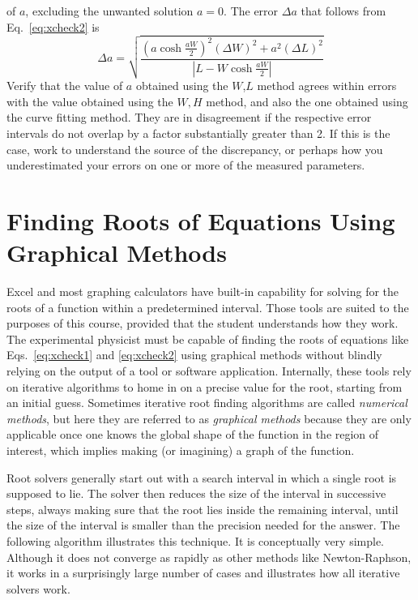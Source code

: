 \documentclass{revtex4}
\begin{document}
of $a$, excluding the unwanted solution $a=0$. The error $\Delta a$
that follows from Eq.~\ref{eq:xcheck2} is
\begin{equation}
\Delta a = \sqrt{\frac{\left(a\cosh{\frac{aW}{2}}\right)^2
(\Delta W)^2 +a^2(\Delta L)^2}{\left| L-W\cosh{\frac{aW}{2}}\right|}}
\label{eq:xcheck2err}
\end{equation}
Verify that the value of $a$ obtained using the $W$,$L$ method agrees
within errors with the value obtained using the $W,H$ method, and also
the one obtained using the curve fitting method. They are in disagreement
if the respective error intervals do not overlap by a factor substantially
greater than 2. If this is the case, work to understand the source of the
discrepancy, or perhaps how you underestimated your errors on one or 
more of the measured parameters.

\section{Finding Roots of Equations Using Graphical Methods}

Excel and most graphing calculators have built-in capability for solving
for the roots of a function within a predetermined interval. Those tools
are suited to the purposes of this course, provided that the student
understands how they work. The experimental physicist must be capable of
finding the roots of equations like Eqs.~\ref{eq:xcheck1} and \ref{eq:xcheck2}
using graphical methods without blindly relying on the output of a tool or
software application.  Internally, these tools rely on iterative algorithms
to home in on a precise value for the root, starting from an initial guess.
Sometimes iterative root finding algorithms are called {\em numerical methods},
but here they are referred to as {\em graphical methods} because they are
only applicable once one knows the global shape of the function in the region
of interest, which implies making (or imagining) a graph of the function.

Root solvers generally start out with a search interval in which a single
root is supposed to lie. The solver then reduces the size of the interval
in successive steps, always making sure that the root lies inside the
remaining interval, until the size of the interval is smaller than the
precision needed for the answer. The following algorithm illustrates this
technique.  It is conceptually very simple. Although it does not converge
as rapidly as other methods like Newton-Raphson, it works in a surprisingly
large number of cases and illustrates how all iterative solvers work.
\end{document}
